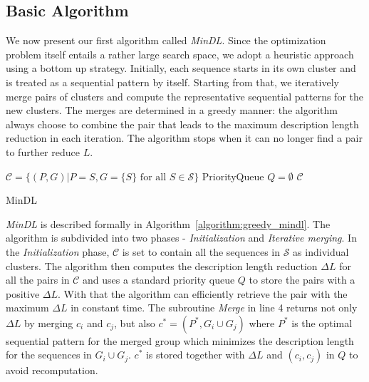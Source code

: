 \subsection{Basic Algorithm}

We now present our first algorithm called \textit{MinDL}. Since the optimization problem itself entails a rather large search space, we adopt a heuristic approach using a bottom up strategy. Initially, each sequence starts in its own cluster and is treated as a sequential pattern by itself. Starting from that, we iteratively merge pairs of clusters and compute the representative sequential patterns for the new clusters. The merges are determined in a greedy manner: the algorithm always choose to combine the pair that leads to the maximum description length reduction in each iteration. The algorithm stops when it can no longer find a pair to further reduce $L$. 
  
\begin{algorithm}
 $\mathscr{C}=\{(P,G)|P=S, G=\{S\} \text{ for all } S \in \mathscr{S}\}$\; 
 PriorityQueue $Q=\emptyset$\;
 \Return $\mathscr{C}$
 \caption{MinDL}
 \label{algorithm:greedy_mindl}
\end{algorithm}  

\textit{MinDL} is described formally in Algorithm~\ref{algorithm:greedy_mindl}. The algorithm is subdivided into two phases - \textit{Initialization} and \textit{Iterative merging}. In the \textit{Initialization} phase, $\mathscr{C}$ is set to contain all the sequences in $\mathscr{S}$ as individual clusters. The algorithm then computes the description length reduction $\Delta L$ for all the pairs in $\mathscr{C}$ and uses a standard priority queue $Q$ to store the pairs with a positive $\Delta L$. With that the algorithm can efficiently retrieve the pair with the maximum $\Delta L$ in constant time. The subroutine \textit{Merge} in line 4 returns not only $\Delta L$ by merging $c_i$ and $c_j$, but also $c^\ast=(P^\ast, G_i \cup G_j )$ where $P^\ast$ is the optimal sequential pattern for the merged group which minimizes the description length for the sequences in $G_i \cup G_j$. $c^\ast$ is stored together with $\Delta L$ and $(c_i, c_j)$ in $Q$ to avoid recomputation. 


